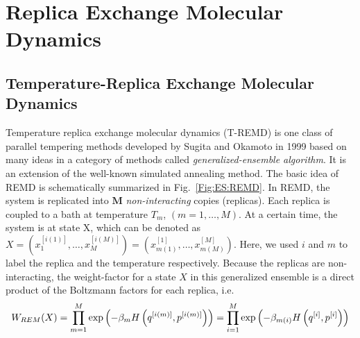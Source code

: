 \section{Replica Exchange Molecular Dynamics\label{Sec:ES:REMD}}
\subsection{Temperature-Replica Exchange Molecular Dynamics}
Temperature replica exchange molecular dynamics (T-REMD) is one class of parallel tempering methods developed by Sugita and Okamoto in 1999\cite{SugitaCPL1999} based on many ideas in a category of methods called \textit{generalized-ensemble algorithm}. It is an extension of the well-known simulated annealing method. The basic idea of REMD is schematically summarized in Fig.~\ref{Fig:ES:REMD}. In REMD, the system is replicated into $\mathbf{M}$ \textit{non-interacting} copies (replicas). Each replica is coupled to a bath at temperature $T_m$, $(m=1,\dots,M)$. At a certain time, the system is at state X, which can be denoted as $X=\left(x_1^{[i(1)]},\dots,x_M^{[i(M)]}\right)=\left(x_{m(1)}^{[1]},\dots,x_{m(M)}^{[M]}\right)$. Here, we used $i$ and $m$ to label the replica and the temperature respectively. Because the replicas are non-interacting, the weight-factor for a state $X$ in this generalized ensemble is a direct product of the Boltzmann factors for each replica, i.e.
\begin{equation}
	W_{REM}(X)=\prod\limits_{m=1}^M\exp{\left(-\beta_m H\left(q^{[i(m)]},p^{[i(m)]}\right)\right)}=\prod\limits_{i=1}^M \exp{\left(-\beta_{m(i)}H\left(q^{[i]},p^{[i]}\right)\right)}\textsl{}
\end{equation}

